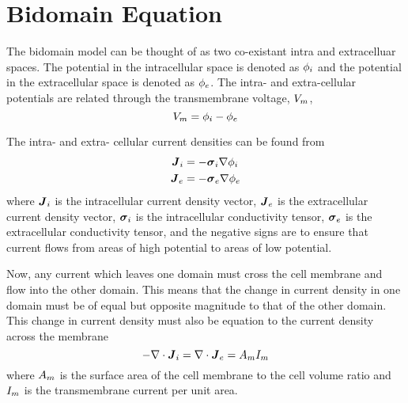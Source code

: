 \section{Bidomain Equation}
\label{sec:Bidomain}

The bidomain model \citep{henriquez:1993} can be thought of as two
co-existant intra and extracelluar spaces. The potential in the
intracellular space is denoted as $ { \phi }_{i} $ and the
potential in the extracellular space is denoted as
$ { \phi }_{e} $. The intra- and extra-cellular potentials are
related through the transmembrane voltage, $ { V }_{m} $,
\ie
\begin{equation}
  \transmembranevoltage=\intracellularpotential-\extracellularpotential
  \label{eqn:TransMembraneVoltageDefinition}
\end{equation} 

The intra- and extra- cellular current densities can be found from
\begin{align}
  \intracellularcurrentdensityvector&=
  -\intracellularconductivitytensor\gradient{}{\intracellularpotential}
  \label{eqn:IntraCellularCurrentDensityVectorDefinition} \\
  \extracellularcurrentdensityvector&=
  -\extracellularconductivitytensor\gradient{}{\extracellularpotential}
  \label{eqn:ExtraCellularCurrentDensityVectorDefinition}  
\end{align}
where $ {  \boldsymbol{J}  }_{i} $ is the intracellular
current density vector, $ {  \boldsymbol{J}  }_{e} $ is the
extracellular current density vector,
$ { \boldsymbol{\mathit{ \sigma }} }_{i} $ is the intracellular conductivity
tensor, $ { \boldsymbol{\mathit{ \sigma }} }_{e} $ is the extracellular
conductivity tensor, and the negative signs are to ensure that current
flows from areas of high potential to areas of low potential.

Now, any current which leaves one domain must cross the cell membrane
and flow into the other domain. This means that the change in current
density in one domain must be of equal but opposite magnitude to that
of the other domain. This change in current density must also be
equation to the current density across the membrane \ie
\begin{equation}
  -\divergence{}{\intracellularcurrentdensityvector}=
  \divergence{}{\extracellularcurrentdensityvector}=
  \membraneareavolumeratio\transmembranecurrent
  \label{eqn:BidomainConservationOfCurrent}
\end{equation}
where $ A_{m} $ is the surface area of the cell
membrane to the cell volume ratio and $ { I }_{m} $ is the
transmembrane current per unit area.

